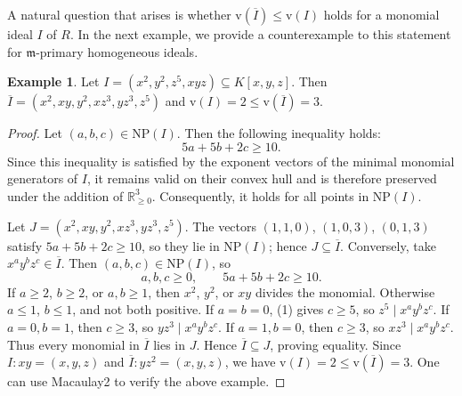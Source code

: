 \documentclass[11pt,reqno,a4paper]{amsart}
\theoremstyle{definition}
\newtheorem{example}[theorem]{Example}
\begin{document}

A natural question that arises is whether \(\mathrm{v}(\overline{I}) \le \mathrm{v}(I)\) holds for a monomial ideal \(I\) of \(R\). In the next example, we provide a counterexample to this statement for \(\mathfrak{m}\)-primary homogeneous ideals.


\begin{example}\label{counterexampletomprimary}
Let $I=(x^2,y^2,z^5,xyz)\subseteq K[x,y,z]$. Then 
\(
\overline I=(x^2,xy,y^2,xz^3,yz^3,z^5)
\)
and $\mathrm{v}(I)=2\le \mathrm{v}(\overline I)=3$.

\begin{proof}
Let $(a,b,c)\in \mathrm{NP}(I)$. Then the following inequality holds:
\[
5a+5b+2c\ge 10.
\]
Since this inequality is satisfied by the exponent vectors of the minimal monomial generators of $I$, it remains valid on their convex hull and is therefore preserved under the addition of $\mathbb R_{\ge 0}^3$. Consequently, it holds for all points in $\mathrm{NP}(I)$.

Let $J=(x^2,xy,y^2,xz^3,yz^3,z^5)$. The vectors $(1,1,0)$, $(1,0,3)$, $(0,1,3)$ satisfy $5a+5b+2c\ge 10$, so they lie in $\mathrm{NP}(I)$; hence $J\subseteq \overline I$.
Conversely, take $x^a y^b z^c\in \overline I$. Then $(a,b,c)\in \mathrm{NP}(I)$, so
\[
a,b,c\ge 0,\qquad 5a+5b+2c\ge 10. \tag{1}
\]
If $a\ge 2$, $b\ge 2$, or $a,b\ge 1$, then $x^2$, $y^2$, or $xy$ divides the monomial. Otherwise $a\le 1$, $b\le 1$, and not both positive. If $a=b=0$, (1) gives $c\ge 5$, so $z^5\mid x^a y^b z^c$. If $a=0,b=1$, then $c\ge 3$, so $yz^3\mid x^a y^b z^c$. If $a=1,b=0$, then $c\ge 3$, so $xz^3\mid x^a y^b z^c$. Thus every monomial in $\overline I$ lies in $J$. Hence $\overline I\subseteq J$, proving equality.
Since $I:xy=(x,y,z)$ and $\overline I:yz^2=(x,y,z)$, we have $\mathrm{v}(I)=2\le \mathrm{v}(\overline I)=3$.  One can use Macaulay2 \cite{GraysonStillman} to verify the above example.






\end{proof}
\end{example}
\end{document}
